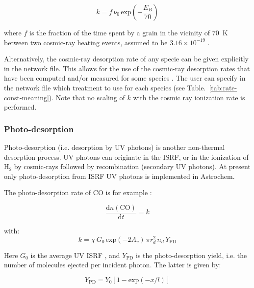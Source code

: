 \documentclass[a4paper,12pt]{article}
\newcommand{\conc}[1]{n(\mathrm{#1})}
\begin{document}
\begin{equation}
  k = f \, \nu_{0} \, \mathrm{exp} \left( -\frac{E_{B}}{70} \right)
  \label{eq:cosmic-ray-desorption}
\end{equation}

\noindent
where $f$ is the fraction of the time spent by a grain in the vicinity
of 70~K between two cosmic-ray heating events, assumed to be $3.16
\times 10^{-19}$ \citep{Hasegawa93}.

Alternatively, the cosmic-ray desorption rate of any specie can be
given explicitly in the network file. This allows for the use of the
cosmic-ray desorption rates that have been computed and/or measured
for some species \citep[e.g. H$_{2}$O and CO;][]{Bringa04}. The user
can specify in the network file which treatment to use for each species
(see Table.~\ref{tab:rate-const-meaning}).  Note that no scaling of
$k$ with the cosmic ray ionization rate is performed.

\subsubsection{Photo-desorption}
\label{sec:photo-desorption}

Photo-desorption (i.e. desorption by UV photons) is another
non-thermal desorption process. UV photons can originate in the ISRF,
or in the ionization of H$_{2}$ by cosmic-rays followed by
recombination (secondary UV photons). At present only photo-desorption
from ISRF UV photons is implemented in Astrochem.

The photo-desorption rate of CO is for example
\citep{Oberg09a,Oberg09b}:

\begin{equation}
  \frac{\mathrm{d} \conc{CO}}{\mathrm{d} t} = k
  \label{eq:photo-desorption-rate}
\end{equation}  

with:
\begin{equation}
  k = \chi \, G_{0} \, \mathrm{exp} \left( -2 A_{v} \right)
  \, \pi r_{d}^{2} \, n_{d} \, Y_\mathrm{PD}
  \label{eq:photo-desorption}
\end{equation}

\noindent
Here $G_{0}$ is the average UV ISRF \citep[assumed to be
10$^{8}$~photons~cm$^{-2}$~s$^{-1}$;][]{Habing68}, and $Y_\mathrm{PD}$
is the photo-desorption yield, i.e. the number of molecules ejected
per incident photon. The latter is given by:

\begin{equation}
  Y_\mathrm{PD} = Y_{0} \left[ 1 - \mathrm{exp} \left( -x / l \right) \right]
  \label{eq:photo-desorption-yield}
\end{equation}
\end{document}
